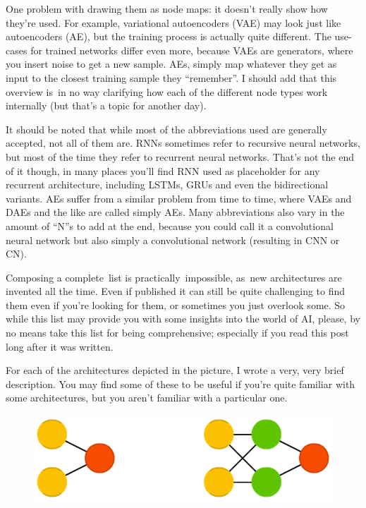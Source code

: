 \documentclass[11pt,a4paper,oneside]{ctexbook}
\begin{document}
One problem with drawing them as node maps: it doesn’t really show how they’re used. For example, variational autoencoders (VAE) may look just like autoencoders (AE), but the training process is actually quite different. The use-cases for trained networks differ even more, because VAEs are generators, where you insert noise to get a new sample. AEs, simply map whatever they get as input to the closest training sample they “remember”. I should add that this overview is in no way clarifying how each of the different node types work internally (but that’s a topic for another day).

It should be noted that while most of the abbreviations used are generally accepted, not all of them are. RNNs sometimes refer to recursive neural networks, but most of the time they refer to recurrent neural networks. That’s not the end of it though, in many places you’ll find RNN used as placeholder for any recurrent architecture, including LSTMs, GRUs and even the bidirectional variants. AEs suffer from a similar problem from time to time, where VAEs and DAEs and the like are called simply AEs. Many abbreviations also vary in the amount of “N”s to add at the end, because you could call it a convolutional neural network but also simply a convolutional network (resulting in CNN or CN).

Composing a complete list is practically impossible, as new architectures are invented all the time. Even if published it can still be quite challenging to find them even if you’re looking for them, or sometimes you just overlook some. So while this list may provide you with some insights into the world of AI, please, by no means take this list for being comprehensive; especially if you read this post long after it was written.

For each of the architectures depicted in the picture, I wrote a very, very brief description. You may find some of these to be useful if you’re quite familiar with some architectures, but you aren’t familiar with a particular one.
	

\begin{figure}
	\centering
	\includegraphics{figures/ff}
	\caption{}
	\label{fig:ff}
\end{figure}
\end{document}
